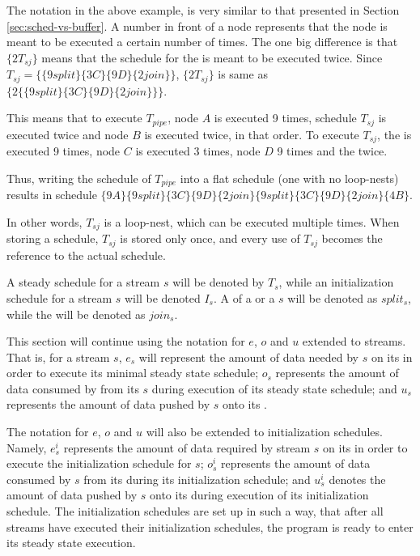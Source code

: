 The notation in the above example, is very similar to that
presented in Section \ref{sec:sched-vs-buffer}.  A number in front
of a node represents that the node is meant to be executed a
certain number of times.  The one big difference is that
$\{2T_{sj}\}$ means that the schedule for the {\pipeline} is meant
to be executed twice.  Since $T_{sj} = \{\{9
split\}\{3C\}\{9D\}\{2 join\}\}$, $\{2T_{sj}\}$ is same as
$\{2\{\{9 split\}\{3C\}\{9D\}\{2 join\}\}\}$.

This means that to execute $T_{pipe}$, node $A$ is executed 9
times, schedule $T_{sj}$ is executed twice and node $B$ is
executed twice, in that order. To execute $T_{sj}$, the {\splitter}
is executed 9 times, node $C$ is executed 3 times, node $D$ 9
times and the {\joiner} twice.

Thus, writing the schedule of $T_{pipe}$ into a flat schedule (one
with no loop-nests) results in schedule $\{9A\}\{9
split\}\{3C\}\{9D\}\{2 join\}\{9 split\}\{3C\}\{9D\}\{2
join\}\{4B\}$.

In other words, $T_{sj}$ is a loop-nest, which can be executed
multiple times. When storing a schedule, $T_{sj}$ is stored only
once, and every use of $T_{sj}$ becomes the reference to the
actual schedule.

A steady schedule for a stream $s$ will be denoted by $T_s$, while
an initialization schedule for a stream $s$ will be denoted $I_s$.
A {\splitter} of a {\splitjoin} or a {\feedbackloop} $s$ will be denoted
as $split_s$, while the {\joiner} will be denoted as $join_s$.

This section will continue using the notation for $e$, $o$ and $u$
extended to streams.  That is, for a stream $s$, $e_s$ will
represent the amount of data needed by $s$ on its {\Input} {{\Channel}}
in order to execute its minimal steady state schedule; $o_s$
represents the amount of data consumed by from its {\Input} {{\Channel}}
$s$ during execution of its steady state schedule; and $u_s$
represents the amount of data pushed by $s$ onto its {\Output}
{{\Channel}}.

The notation for $e$, $o$ and $u$ will also be extended to
initialization schedules.  Namely, $e^i_s$ represents the amount
of data required by stream $s$ on its {\Input} {{\Channel}} in order to
execute the initialization schedule for $s$; $o^i_s$ represents
the amount of data consumed by $s$ from its {\Input} {{\Channel}} during
its initialization schedule; and $u^i_s$ denotes the amount of
data pushed by $s$ onto its {\Output} {{\Channel}} during execution of
its initialization schedule.  The initialization schedules are set
up in such a way, that after all streams have executed their
initialization schedules, the program is ready to enter its steady
state execution.

